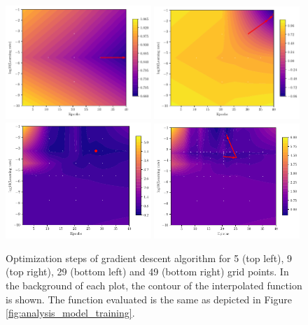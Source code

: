 \begin{figure}[htbp!]
	\centering
	\includegraphics[width=0.49\textwidth]{figures/Results/Machine_learning/optimizer/Optimizers_visualization_ml_5}
	\includegraphics[width=0.49\textwidth]{figures/Results/Machine_learning/optimizer/Optimizers_visualization_ml_10}
	\includegraphics[width=0.49\textwidth]{figures/Results/Machine_learning/optimizer/Optimizers_visualization_ml_30}
	\includegraphics[width=0.49\textwidth]{figures/Results/Machine_learning/optimizer/Optimizers_visualization_ml_50}
	
	\caption{ Optimization steps of gradient descent algorithm for 5 (top left), 9 (top right), 29 (bottom left) and 49 (bottom right) grid points. In the background of each plot, the contour of the interpolated function is shown. The function evaluated is the same as depicted in Figure \ref{fig:analysis_model_training}. }
	\label{fig:optimizers_network_visualization}
\end{figure}

